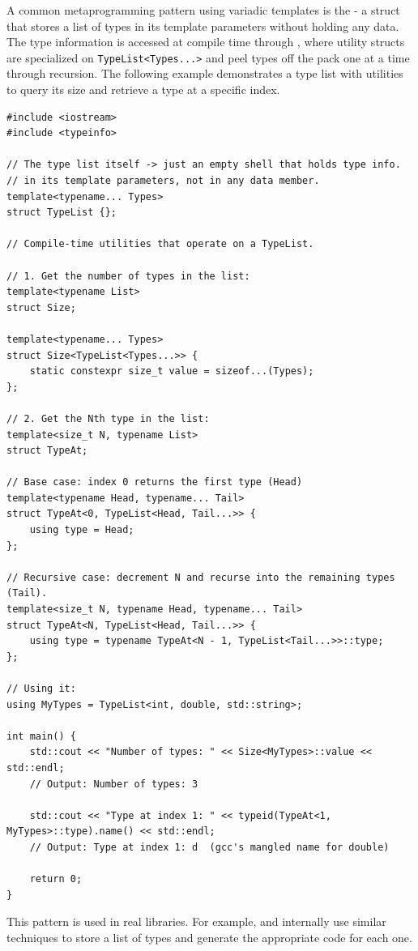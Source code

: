 A common metaprogramming pattern using variadic templates is the  - a struct that stores a list of types in its template parameters without holding any data. The type information is accessed at compile time through , where utility structs are specialized on \texttt{TypeList<Types...>} and peel types off the pack one at a time through recursion. The following example demonstrates a type list with utilities to query its size and retrieve a type at a specific index.
\begin{lstlisting}
#include <iostream>
#include <typeinfo>

// The type list itself -> just an empty shell that holds type info.
// in its template parameters, not in any data member.
template<typename... Types>
struct TypeList {};

// Compile-time utilities that operate on a TypeList.

// 1. Get the number of types in the list:
template<typename List>
struct Size;

template<typename... Types>
struct Size<TypeList<Types...>> {
    static constexpr size_t value = sizeof...(Types);
};

// 2. Get the Nth type in the list:
template<size_t N, typename List>
struct TypeAt;

// Base case: index 0 returns the first type (Head)
template<typename Head, typename... Tail>
struct TypeAt<0, TypeList<Head, Tail...>> {
    using type = Head;
};

// Recursive case: decrement N and recurse into the remaining types (Tail).
template<size_t N, typename Head, typename... Tail>
struct TypeAt<N, TypeList<Head, Tail...>> {
    using type = typename TypeAt<N - 1, TypeList<Tail...>>::type;
};

// Using it:
using MyTypes = TypeList<int, double, std::string>;

int main() {
    std::cout << "Number of types: " << Size<MyTypes>::value << std::endl;
    // Output: Number of types: 3

    std::cout << "Type at index 1: " << typeid(TypeAt<1, MyTypes>::type).name() << std::endl;
    // Output: Type at index 1: d  (gcc's mangled name for double)

    return 0;
}
\end{lstlisting}
This pattern is used in real libraries. For example,  and  internally use similar techniques to store a list of types and generate the appropriate code for each one.

